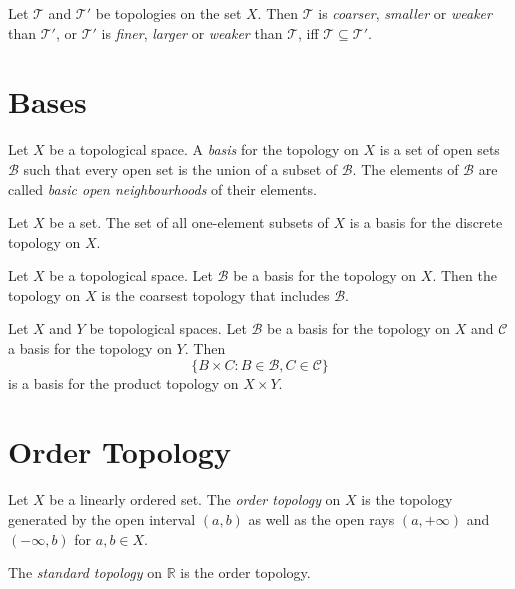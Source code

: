 \begin{df}
Let $\mathcal{T}$ and $\mathcal{T}'$ be topologies on the set $X$. Then $\mathcal{T}$ is \emph{coarser}, \emph{smaller} or \emph{weaker} than $\mathcal{T}'$, or $\mathcal{T}'$ is \emph{finer}, \emph{larger} or \emph{weaker} than $\mathcal{T}$, iff $\mathcal{T} \subseteq \mathcal{T}'$.
\end{df}

\section{Bases}

\begin{df}[Basis]
Let $X$ be a topological space. A \emph{basis} for the topology on $X$ is a set of open sets $\mathcal{B}$ such that every open set is the union of a subset of $\mathcal{B}$. The elements of $\mathcal{B}$ are called \emph{basic open neighbourhoods} of their elements.
\end{df}

\begin{prop}
Let $X$ be a set. The set of all one-element subsets of $X$ is a basis for the discrete topology on $X$.
\end{prop}

\begin{prop}
Let $X$ be a topological space.
Let $\mathcal{B}$ be a basis for the topology on $X$.
Then the topology on $X$ is the coarsest topology that includes $\mathcal{B}$.
\end{prop}

\begin{prop}
Let $X$ and $Y$ be topological spaces. Let $\mathcal{B}$ be a basis for the topology on $X$ and $\mathcal{C}$ a basis for the topology on $Y$. Then
\[ \{ B \times C : B \in \mathcal{B}, C \in \mathcal{C} \} \]
is a basis for the product topology on $X \times Y$.
\end{prop}

\section{Order Topology}

\begin{df}
Let $X$ be a linearly ordered set. The \emph{order topology} on $X$ is the topology generated by the open interval $(a,b)$ as well as the open rays $(a, + \infty)$ and $(-\infty, b)$ for $a,b \in X$.

The \emph{standard topology} on $\mathbb{R}$ is the order topology.
\end{df}

